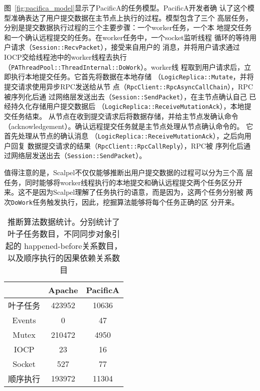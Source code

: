 
图~\ref{fig:pacifica_model}显示了PacificA的任务模型。PacificA开发者确
认了这个模型准确表达了用户提交数据在主节点上执行的过程。模型包含了三个
高层任务，分别是提交数据执行过程的三个主要步骤：一个worker任务，一个本
地提交任务和一个确认远程提交的任务。在worker任务中，一个socket监听线程
循环的等待用户请求（\texttt{Session\-::Recv\-Packet}），接受来自用户的
消息，并将用户请求通过IOCP交给线程池中的worker线程去执行
（\texttt{PA\-Thread\-Pool\-::Thread\-Internal\-::DoWork}）。worker线
程取到用户请求后，立即执行本地提交任务。它首先将数据在本地存储
（\texttt{Logic\-Replica\-::Mutate}，并将提交请求使用异步RPC发送给从节
点（\texttt{Rpc\-Client\-::Rpc\-Async\-Call\-Chain}），RPC被序列化后通
过网络层发送出去（\texttt{Session\-::Send\-Packet}），在主节点确认自己
已经持久化存储用户提交数据后
（\texttt{Logic\-Replica\-::Receive\-MutationAck}），本地提交任务结束。
从节点在收到提交请求后将数据存储，并给主节点发确认命令
（acknowledgement）。确认远程提交任务就是主节点处理从节点确认命令的。
它首先处理从节点的确认消息
（\texttt{Logic\-Replica\-::Receive\-Mutation\-Ack}），之后向用户回复
数据提交请求的结果（\texttt{Rpc\-Client\-::Rpc\-Call\-Reply}），RPC被
序列化后通过网络层发送出去（\texttt{Session\-::Send\-Packet}）。

值得注意的是，Scalpel不仅仅能够推断出用户提交数据的过程可以分为三个高
层任务，同时能够将worker线程执行的本地提交和确认远程提交两个任务区分开
来。这不是因为Scalpel理解了任务执行的语意，而是因为，这两个任务分别被
两次\texttt{DoWork}任务触发执行，因此，挖掘算法能够将每个任务正确的区
分开来。

\begin{table}[t!]
\small
\centering
\begin{minipage}{0.8\linewidth}
\centering
\caption{推断算法数据统计。分别统计了叶子任务数目，不同同步对象引起的
happened-before关系数目，以及顺序执行的因果依赖关系数目}
\label{fig:statistics}
\begin{tabular}{ccc}

\toprule[1.5pt]
  		& Apache	& PacificA \\
\midrule[1pt]
叶子任务	& 423952	& 10636 \\
Events		& 0			& 47 \\
Mutex 		& 210472	& 4950 \\
IOCP		& 23		& 16 \\
Socket		& 527		& 77 \\
顺序执行	& 193972	& 11304 \\
\bottomrule[1.5pt]
\end{tabular}
\end{minipage}
\end{table}

